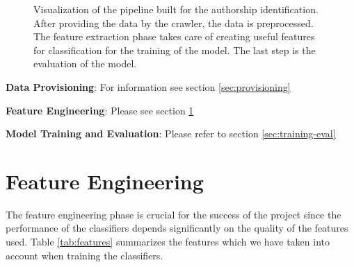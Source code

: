 \documentclass[journal, a4paper]{IEEEtran}
\begin{document}
\begin{figure}[h]
	\caption{Visualization of the pipeline built for the authorship identification. After providing the data by the crawler, the data is
	 preprocessed. The feature extraction phase takes care of creating useful features for classification for the training of the model.
	The last step is the evaluation of the model.}
	\vspace*{5mm}
\end{figure}

\textbf{Data Provisioning}: For information see section \ref{sec:provisioning}

\textbf{Feature Engineering}: Please see section \ref{sec:features}

\textbf{Model Training and Evaluation}: Please refer to section \ref{sec:training-eval} 

\section{Feature Engineering}
\label{sec:features}

The feature engineering phase is crucial for the success of the project since the performance of the classifiers depends significantly on the quality of the features used. Table \ref{tab:features} summarizes the features which we have taken into account when training the classifiers.  
\end{document}
